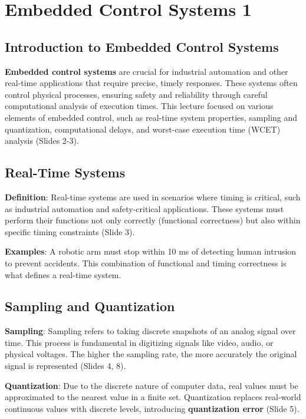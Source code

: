 \documentclass[
  14pt,
  a4paper,
  numbers=noendperiod,
  headinclude=true,
  footinclude=true,
  DIV=calc]{scrreprt}
\begin{document}
\chapter{Embedded Control Systems 1}\label{embedded-control-systems-1}

\section{Introduction to Embedded Control
Systems}\label{introduction-to-embedded-control-systems}

\textbf{Embedded control systems} are crucial for industrial automation
and other real-time applications that require precise, timely responses.
These systems often control physical processes, ensuring safety and
reliability through careful computational analysis of execution times.
This lecture focused on various elements of embedded control, such as
real-time system properties, sampling and quantization, computational
delays, and worst-case execution time (WCET) analysis (Slides 2-3).

\section{Real-Time Systems}\label{real-time-systems}

\textbf{Definition}: Real-time systems are used in scenarios where
timing is critical, such as industrial automation and safety-critical
applications. These systems must perform their functions not only
correctly (functional correctness) but also within specific timing
constraints (Slide 3).

\textbf{Examples}: A robotic arm must stop within 10 ms of detecting
human intrusion to prevent accidents. This combination of functional and
timing correctness is what defines a real-time system.

\section{Sampling and Quantization}\label{sampling-and-quantization}

\textbf{Sampling}: Sampling refers to taking discrete snapshots of an
analog signal over time. This process is fundamental in digitizing
signals like video, audio, or physical voltages. The higher the sampling
rate, the more accurately the original signal is represented (Slides 4,
8).

\textbf{Quantization}: Due to the discrete nature of computer data, real
values must be approximated to the nearest value in a finite set.
Quantization replaces real-world continuous values with discrete levels,
introducing \textbf{quantization error} (Slide 5).
\end{document}
